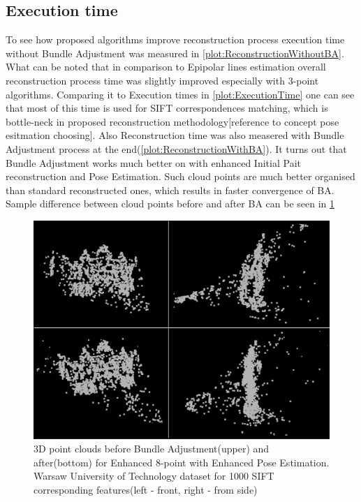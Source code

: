 \subsection{Execution time}
To see how proposed algorithms improve reconstruction process execution time without Bundle Adjustment was measured in \ref{plot:ReconstructionWithoutBA}. What can be noted that in comparison to Epipolar lines estimation overall reconstruction process time was slightly improved especially with 3-point algorithms. Comparing it to Execution times in \ref{plot:ExecutionTime} one can see that most of this time is used for SIFT correspondences matching, which is bottle-neck in proposed reconstruction methodology[reference to concept pose esitmation choosing]. Also Reconstruction time was also measered with Bundle Adjustment process at the end(\ref{plot:ReconstructionWithBA}). It turns out that Bundle Adjustment works much better on with enhanced Initial Pait reconstruction and Pose Estimation. Such cloud points are much better organised than standard reconstructed ones, which results in faster convergence of BA. Sample difference between cloud points before and after BA can be seen in \ref{fig:BundleAdjustmentComparison}
\begin{figure}[b!]
    \centering
    \includegraphics[width=\textwidth]{bundleAdjustmentComparison}
    \caption{3D point clouds before Bundle Adjustment(upper) and after(bottom) for Enhanced 8-point with Enhanced Pose Estimation. Warsaw University of Technology dataset for 1000 SIFT corresponding features(left - front, right - from side)}
    \label{fig:BundleAdjustmentComparison}
\end{figure}
